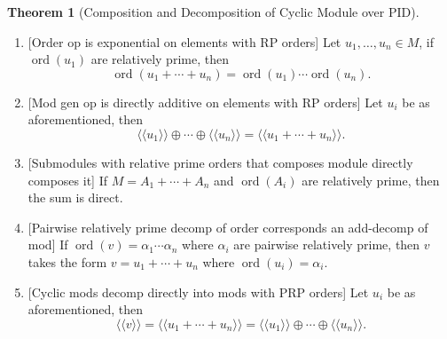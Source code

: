 \documentclass[10pt]{report}
\theoremstyle{definition}
\newtheorem{theorem}{Theorem}
\begin{document}
\begin{theorem}[Composition and Decomposition of Cyclic Module over PID]\leavevmode
\begin{enumerate}
\item {} [Order op is exponential on elements with RP orders]
Let $u_1,\dots,u_n\in M$, if $\operatorname{ord}(u_1)$ are relatively prime, then $$\operatorname{ord}(u_1+\cdots+u_n)=\operatorname{ord}(u_1)\cdots\operatorname{ord}(u_n).$$
\item {} [Mod gen op is directly additive on elements with RP orders]
Let $u_i$ be as aforementioned, then $$\langle\langle u_1\rangle\rangle\oplus\cdots\oplus\langle\langle u_n\rangle\rangle=\langle\langle u_1+\cdots+u_n\rangle\rangle.$$
\item {} [Submodules with relative prime orders that composes module directly composes it]
If $M=A_1+\cdots+A_n$ and $\operatorname{ord}(A_i)$ are relatively prime, then the sum is direct.
\item {} [Pairwise relatively prime decomp of order corresponds an add-decomp of mod]
If $\operatorname{ord}(v)=\alpha_1\cdots\alpha_n$ where $\alpha_i$ are pairwise relatively prime, then $v$ takes the form $v=u_1+\cdots+u_n$ where $\operatorname{ord}(u_i)=\alpha_i$.
\item {} [Cyclic mods decomp directly into mods with PRP orders]
Let $u_i$ be as aforementioned, then $$\langle\langle v\rangle\rangle=\langle\langle u_1+\cdots+u_n\rangle\rangle=\langle\langle u_1\rangle\rangle\oplus\cdots\oplus\langle\langle u_n\rangle\rangle.$$
\end{enumerate}
\end{theorem}
\end{document}
